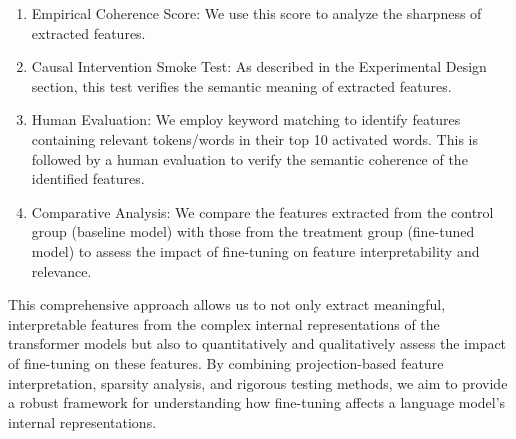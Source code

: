 \begin{enumerate}
    \item Empirical Coherence Score: We use this score to analyze the sharpness of extracted features.
    \item Causal Intervention Smoke Test: As described in the Experimental Design section, this test verifies the semantic meaning of extracted features.
    \item Human Evaluation: We employ keyword matching to identify features containing relevant tokens/words in their top 10 activated words. This is followed by a human evaluation to verify the semantic coherence of the identified features.
    \item Comparative Analysis: We compare the features extracted from the control group (baseline model) with those from the treatment group (fine-tuned model) to assess the impact of fine-tuning on feature interpretability and relevance.
\end{enumerate}

This comprehensive approach allows us to not only extract meaningful, interpretable features from the complex internal representations of the transformer models but also to quantitatively and qualitatively assess the impact of fine-tuning on these features. By combining projection-based feature interpretation, sparsity analysis, and rigorous testing methods, we aim to provide a robust framework for understanding how fine-tuning affects a language model's internal representations.